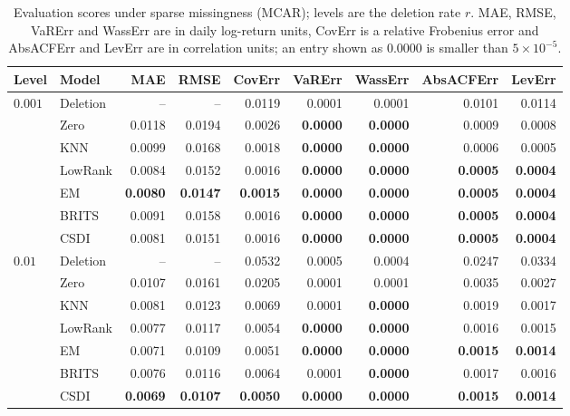 \begin{table}[p]
  \centering
  \footnotesize
  \caption[Evaluation scores under sparse missingness]{Evaluation scores under sparse missingness (MCAR); levels are the deletion rate $r$. MAE, RMSE, VaRErr and WassErr are in daily log-return units, CovErr is a relative Frobenius error and AbsACFErr and LevErr are in correlation units; an entry shown as $0.0000$ is smaller than $5\times 10^{-5}$.}
  \label{tab:results_sparse}
  \begin{tabular}{llrrrrrrr}
    \toprule
    Level & Model & MAE & RMSE & CovErr & VaRErr & WassErr & AbsACFErr & LevErr \\
    \midrule
    $0.001$ & Deletion & -- & -- & 0.0119 & 0.0001 & 0.0001 & 0.0101 & 0.0114 \\
     & Zero & 0.0118 & 0.0194 & 0.0026 & \textbf{0.0000} & \textbf{0.0000} & 0.0009 & 0.0008 \\
     & KNN & 0.0099 & 0.0168 & 0.0018 & \textbf{0.0000} & \textbf{0.0000} & 0.0006 & 0.0005 \\
     & LowRank & 0.0084 & 0.0152 & 0.0016 & \textbf{0.0000} & \textbf{0.0000} & \textbf{0.0005} & \textbf{0.0004} \\
     & EM & \textbf{0.0080} & \textbf{0.0147} & \textbf{0.0015} & \textbf{0.0000} & \textbf{0.0000} & \textbf{0.0005} & \textbf{0.0004} \\
     & BRITS & 0.0091 & 0.0158 & 0.0016 & \textbf{0.0000} & \textbf{0.0000} & \textbf{0.0005} & \textbf{0.0004} \\
     & CSDI & 0.0081 & 0.0151 & 0.0016 & \textbf{0.0000} & \textbf{0.0000} & \textbf{0.0005} & \textbf{0.0004} \\
    \midrule
    $0.01$ & Deletion & -- & -- & 0.0532 & 0.0005 & 0.0004 & 0.0247 & 0.0334 \\
     & Zero & 0.0107 & 0.0161 & 0.0205 & 0.0001 & 0.0001 & 0.0035 & 0.0027 \\
     & KNN & 0.0081 & 0.0123 & 0.0069 & 0.0001 & \textbf{0.0000} & 0.0019 & 0.0017 \\
     & LowRank & 0.0077 & 0.0117 & 0.0054 & \textbf{0.0000} & \textbf{0.0000} & 0.0016 & 0.0015 \\
     & EM & 0.0071 & 0.0109 & 0.0051 & \textbf{0.0000} & \textbf{0.0000} & \textbf{0.0015} & \textbf{0.0014} \\
     & BRITS & 0.0076 & 0.0116 & 0.0064 & 0.0001 & \textbf{0.0000} & 0.0017 & 0.0016 \\
     & CSDI & \textbf{0.0069} & \textbf{0.0107} & \textbf{0.0050} & \textbf{0.0000} & \textbf{0.0000} & \textbf{0.0015} & \textbf{0.0014} \\

\end{tabular}
\end{table}

